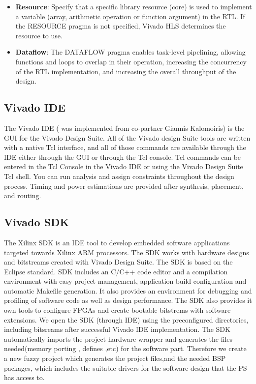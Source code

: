 \begin{itemize}
    \item \textbf{Resource}: Specify that a specific library resource (core) is used to implement a variable (array, arithmetic operation or function argument) in the RTL. If the RESOURCE pragma is not specified, Vivado HLS determines the resource to use.    

    \item \textbf{Dataflow}: The DATAFLOW pragma enables task-level pipelining, allowing functions and loops to overlap in their operation, increasing the concurrency of the RTL implementation, and increasing the overall throughput of the design.\newline \newline
    
    
\end{itemize}



\subsection{Vivado IDE}

The Vivado IDE ( was implemented from  co-partner Giannis Kalomoiris) is the GUI for the Vivado Design Suite. All of the Vivado design Suite tools are written with a native Tcl interface, and all of those commands are available through the IDE either through the GUI or through the Tcl console. Tcl commands can be entered in the Tcl Console in the Vivado IDE or using the Vivado Design Suite Tcl shell. You can run analysis and assign constraints throughout the design process. Timing and power estimations are provided after synthesis, placement, and routing. 
 



\subsection{Vivado SDK}

The Xilinx SDK is an IDE tool to develop embedded software applications targeted towards Xilinx ARM processors. The SDK works with hardware designs and bitstreams created with Vivado Design Suite. The SDK is based on the Eclipse standard. SDK includes an  C/C++ code editor and a compilation environment with easy project management, application build configuration and automatic Makefile generation. It also provides an environment for debugging and profiling of software code as well as design performance. The SDK also provides it own tools to configure FPGAs and create bootable bitstrems with software extensions.
We open the SDK (through IDE) using the preconfigured directories, including bitsreams after successful Vivado IDE implementation. The SDK automatically imports the project hardware wrapper and generates the files needed(memory porting , defines ,etc) for the software part. Therefore we create a new fuzzy project which generates the project files,and the needed BSP packages, which includes the suitable drivers for the software design that the PS has access to.

